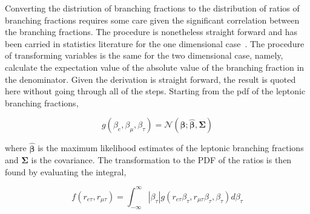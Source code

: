 

Converting the distriution of branching fractions to the distribution of
ratios of branching fractions requires some care given the significant
correlation between the branching fractions.  The procedure is
nonetheless straight forward and has been carried in statistics
literature for the one dimensional case~\cite{10.1093/biomet/24.3-4.428,
10.2307/2334671}.  The procedure of transforming variables is the same
for the two dimensional case, namely, calculate the expectation value of
the absolute value of the branching fraction in the denominator.  Given
the derivation is straight forward, the result is quoted here without
going through all of the steps.  Starting from the pdf of the leptonic
branching fractions,

\begin{equation}
    g(\beta_{e}, \beta_{\mu}, \beta_{\tau}) =
    \mathcal{N}\left(\boldsymbol{\beta}; \hat{\boldsymbol{\beta}}, \boldsymbol{\Sigma}\right)
\end{equation}

\noindent where $\hat{\boldsymbol{\beta}}$ is the maximum likelihood estimates of the
leptonic branching fractions and $\boldsymbol{\Sigma}$ is the covariance.
The transformation to the PDF of the ratios is then found by evaluating
the integral,




\begin{equation}
    f(r_{e\tau}, r_{\mu\tau}) = \int_{-\infty}^{\infty}
    \left| \beta_{\tau}\right|g(r_{e\tau}\beta_{\tau}, r_{\mu\tau}\beta_{\tau}, \beta_{\tau})
    d\beta_{\tau}
\end{equation}




